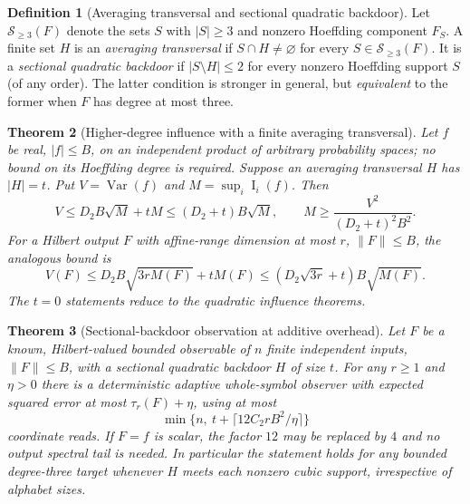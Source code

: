 \documentclass[11pt,letterpaper]{article}
\newtheorem{theorem}{Theorem}[section]
\theoremstyle{definition}
\newtheorem{definition}[theorem]{Definition}
\newcommand{\Var}{\operatorname{Var}}
\newcommand{\Inf}{\operatorname{I}}
\begin{document}
\begin{definition}[Averaging transversal and sectional quadratic backdoor]\label{def:backdoor}
Let $\mathscr S_{\ge3}(F)$ denote the sets $S$ with $|S|\ge3$ and
nonzero Hoeffding component $F_S$. A finite set $H$ is an
\emph{averaging transversal} if $S\cap H\ne\varnothing$ for every
$S\in\mathscr S_{\ge3}(F)$. It is a \emph{sectional quadratic
backdoor} if $|S\setminus H|\le2$ for every nonzero Hoeffding support
$S$ (of any order). The latter condition is stronger in general, but
\emph{equivalent} to the former when $F$ has degree at most three.
\end{definition}
\begin{theorem}[Higher-degree influence with a finite averaging transversal]\label{thm:transversal}
Let $f$ be real, $|f|\le B$, on an independent product of arbitrary
probability spaces; no bound on its Hoeffding degree is required.
Suppose an averaging transversal $H$ has $|H|=t$. Put
$V=\Var(f)$ and $M=\sup_i\Inf_i(f)$. Then
\begin{equation}\label{eq:hit}
V\le D_2B\sqrt M+tM\le(D_2+t)B\sqrt M,
\qquad
\boxed{M\ge\frac{V^2}{(D_2+t)^2B^2}.}
\end{equation}
For a Hilbert output $F$ with affine-range dimension at most $r$,
$\|F\|\le B$, the analogous bound is
\begin{equation}\label{eq:hit-rank}
V(F)\le D_2B\sqrt{3r M(F)}+tM(F)
\le(D_2\sqrt{3r}+t)B\sqrt{M(F)}.
\end{equation}
The $t=0$ statements reduce to the quadratic influence theorems.
\end{theorem}
\begin{theorem}[Sectional-backdoor observation at additive overhead]\label{thm:backdoor-observe}
Let $F$ be a known, Hilbert-valued bounded observable of $n$ finite
independent inputs, $\|F\|\le B$, with a sectional quadratic backdoor
$H$ of size $t$. For any $r\ge1$ and $\eta>0$ there is a deterministic
adaptive whole-symbol observer with expected squared error at most
$\tau_r(F)+\eta$, using at most
\begin{equation}\label{eq:backdoor-depth}
\boxed{\min\{n,\ t+\lceil12C_2rB^2/\eta\rceil\}}
\end{equation}
coordinate reads. If $F=f$ is scalar, the factor $12$ may be replaced
by $4$ and no output spectral tail is needed. In particular the
statement holds for any bounded \emph{degree-three} target whenever
$H$ meets each nonzero cubic support, irrespective of alphabet sizes.
\end{theorem}
\end{document}
